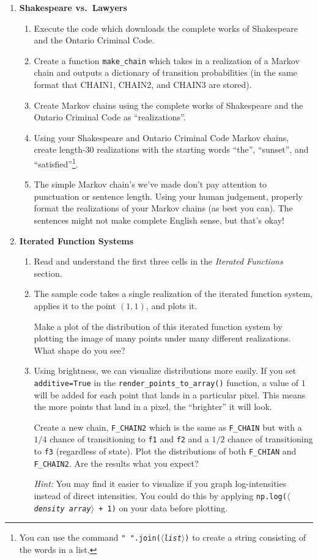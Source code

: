 \documentclass[letter]{article}
\newcommand{\var}[1]{{$\langle$\it #1$\rangle$}}
\begin{document}
\begin{enumerate}
		\item {\bf Shakespeare vs.~Lawyers}
		\begin{enumerate}
			\item Execute the code which downloads the complete works of Shakespeare and the Ontario Criminal Code.
			\item Create a function \verb|make_chain| which takes in a realization of a Markov chain and outputs
				a dictionary of transition probabilities (in the same format that CHAIN1, CHAIN2, and CHAIN3
				are stored).
			\item Create Markov chains using the complete works of Shakespeare and the Ontario Criminal Code
				as ``realizations''.
			\item Using your Shakespeare and Ontario Criminal Code Markov chains, create length-30 realizations
				with the starting words ``the'', ``sunset'', and ``satisfied''\footnote{ You can use the command
				{\tt " ".join(\var{list})} to create a string consisting of the words in a list.}.
			\item The simple Markov chain's we've made don't pay attention to punctuation or sentence length. Using
				your human judgement, properly format the realizations of your Markov chains (as best you can).
				The sentences might not make complete English sense, but that's okay!
		\end{enumerate}
	\item {\bf Iterated Function Systems}
		\begin{enumerate}
			\item Read and understand the first three cells in the \emph{Iterated Functions} section.
			\item The sample code takes a single realization of the iterated function system, applies
				it to the point $(1,1)$, and plots it.

				Make a plot of the distribution of this iterated function system by plotting the image
				of many points under many different realizations. What shape do you see?
			\item Using brightness, we can visualize distributions more easily. If you set {\tt additive=True}
				in the \verb|render_points_to_array()| function, a value of $1$ will be added for each
				point that lands in a particular pixel. This means the more points that land in a pixel,
				the ``brighter'' it will look.

				Create a new chain, \verb|F_CHAIN2| which is the same as \verb|F_CHAIN| but with a $1/4$ chance
				of transitioning to {\tt f1} and {\tt f2} and a $1/2$ chance of transitioning to {\tt f3} 
				(regardless of state). Plot the distributions of both \verb|F_CHIAN| and \verb|F_CHAIN2|. Are the 
				results what you expect?

				\emph{Hint:} You may find it easier to visualize if you graph log-intensities instead of 
				direct intensities. You could do this by applying {\tt np.log(\var{density array} + 1)}
				on your data before plotting.

				
		\end{enumerate}
	\end{enumerate}
\end{document}
